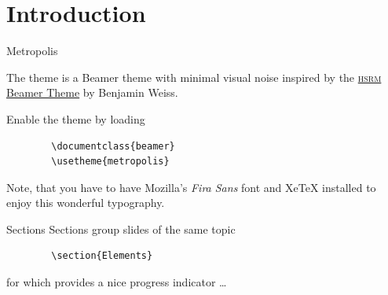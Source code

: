 \section{Introduction}

\begin{frame}[fragile]{Metropolis}

    The \themename theme is a Beamer theme with minimal visual noise
    inspired by the \href{https://github.com/hsrmbeamertheme/hsrmbeamertheme}{\textsc{hsrm} Beamer
    Theme} by Benjamin Weiss.

    Enable the theme by loading

    \begin{verbatim}        \documentclass{beamer}
        \usetheme{metropolis}\end{verbatim}

    Note, that you have to have Mozilla's \emph{Fira Sans} font and XeTeX
    installed to enjoy this wonderful typography.
\end{frame}
\begin{frame}[fragile]{Sections}
    Sections group slides of the same topic

    \begin{verbatim}        \section{Elements}\end{verbatim}

    for which \themename provides a nice progress indicator \ldots
\end{frame}
